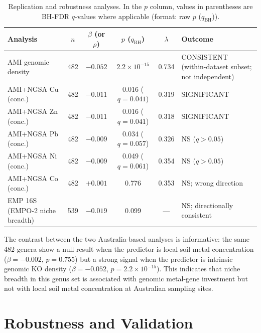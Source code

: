\documentclass[times]{zHenriquesLab-StyleBioRxiv}
\begin{document}
\begin{table}[htbp]
\caption{Replication and robustness analyses. In the $p$ column, values in parentheses
are BH-FDR $q$-values where applicable (format: raw $p$ ($q_{\mathrm{BH}}$)).}
\label{tab:6}
\centering
\small
\begin{tabular}{lcccc p{4cm}}
\toprule
Analysis & $n$ & $\beta$ (or $\rho$) & $p$ ($q_{\mathrm{BH}}$) & $\lambda$ & Outcome \\
\midrule
AMI genomic density & 482 & $\mathbf{-0.052}$ & $2.2 \times 10^{-15}$
  & 0.734 & CONSISTENT (within-dataset subset; not independent) \\
AMI+NGSA Cu (conc.) & 482 & $-0.011$
  & 0.016 ($q = 0.041$) & 0.319 & SIGNIFICANT \\
AMI+NGSA Zn (conc.) & 482 & $-0.011$
  & 0.016 ($q = 0.041$) & 0.318 & SIGNIFICANT \\
AMI+NGSA Pb (conc.) & 482 & $-0.009$
  & 0.034 ($q = 0.057$) & 0.326 & NS ($q > 0.05$) \\
AMI+NGSA Ni (conc.) & 482 & $-0.009$
  & 0.049 ($q = 0.061$) & 0.354 & NS ($q > 0.05$) \\
AMI+NGSA Co (conc.) & 482 & $+0.001$ & 0.776 & 0.353
  & NS; wrong direction \\
EMP 16S (EMPO-2 niche breadth) & 539 & $-0.019$ & 0.099 & ---
  & NS; directionally consistent \\
\bottomrule
\end{tabular}
\end{table}

The contrast between the two Australia-based analyses is informative: the same
482 genera show a null result when the predictor is local soil metal
concentration ($\beta = -0.002$, $p = 0.755$) but a strong signal when the
predictor is intrinsic genomic KO density ($\beta = -0.052$,
$p = 2.2 \times 10^{-15}$). This indicates that niche breadth in this genus set
is associated with genomic metal-gene investment but not with local soil metal
concentration at Australian sampling sites.





\section*{Robustness and Validation}
\setcounter{subsection}{0}
\end{document}
